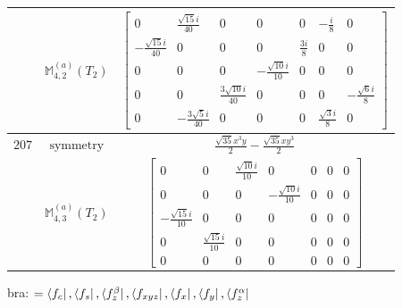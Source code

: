 \documentclass[fleqn,8pt,landscape]{jsarticle}
\begin{document}
\begin{longtable}{ccc}
$  $ & $ \mathbb{M}_{4,2}^{(a)}(T_{2}) $ & $ \begin{bmatrix} 0 & \frac{\sqrt{15} i}{40} & 0 & 0 & 0 & - \frac{i}{8} & 0 \\ - \frac{\sqrt{15} i}{40} & 0 & 0 & 0 & \frac{3 i}{8} & 0 & 0 \\ 0 & 0 & 0 & - \frac{\sqrt{10} i}{10} & 0 & 0 & 0 \\ 0 & 0 & \frac{3 \sqrt{10} i}{40} & 0 & 0 & 0 & - \frac{\sqrt{6} i}{8} \\ 0 & - \frac{3 \sqrt{5} i}{40} & 0 & 0 & 0 & \frac{\sqrt{3} i}{8} & 0 \end{bmatrix} $ \\ \hline
$ 207 $ & $ \text{symmetry} $ & $ \frac{\sqrt{35} x^{3} y}{2} - \frac{\sqrt{35} x y^{3}}{2} $ \\
$  $ & $ \mathbb{M}_{4,3}^{(a)}(T_{2}) $ & $ \begin{bmatrix} 0 & 0 & \frac{\sqrt{10} i}{10} & 0 & 0 & 0 & 0 \\ 0 & 0 & 0 & - \frac{\sqrt{10} i}{10} & 0 & 0 & 0 \\ - \frac{\sqrt{15} i}{10} & 0 & 0 & 0 & 0 & 0 & 0 \\ 0 & \frac{\sqrt{15} i}{10} & 0 & 0 & 0 & 0 & 0 \\ 0 & 0 & 0 & 0 & 0 & 0 & 0 \end{bmatrix} $ \\ \hline
\end{longtable}
bra: $=\bra{f_{c}}, \bra{f_{s}}, \bra{f_{z}^{\beta}}, \bra{f_{xyz}}, \bra{f_{x}}, \bra{f_{y}}, \bra{f_{z}^{\alpha}}$
\end{document}
